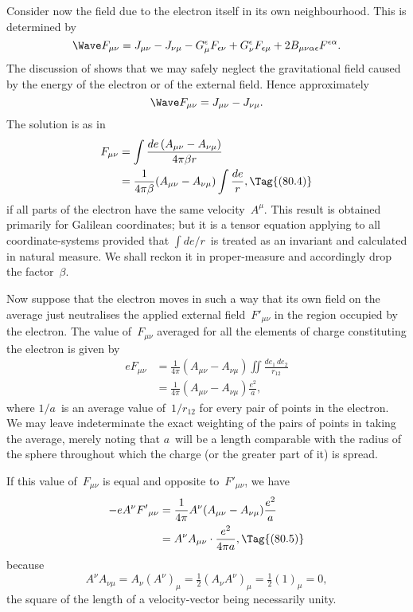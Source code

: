 \documentclass[12pt]{book}
\begin{document}
Consider now the field due to the electron itself in its own neighbourhood.
This is determined by~
\[
\Wave F_{\mu\nu} = J_{\mu\nu} - J_{\nu\mu}
- G_{\mu}^{\epsilon} F_{\epsilon\nu} + G_{\nu}^{\epsilon} F_{\epsilon\mu}
+ 2B_{\mu\nu\alpha\epsilon} F^{\epsilon\alpha}.
\]
The discussion of  shows that we may safely neglect the gravitational
field caused by the energy of the electron or of the external field. Hence
approximately
\[
\Wave F_{\mu\nu} = J_{\mu\nu} - J_{\nu\mu}.
\]
The solution is as in~
\begin{align*}
  F_{\mu\nu} &= \int \frac{de\, (A_{\mu\nu} - A_{\nu\mu})}{4\pi\beta r} \\
  &= \frac{1}{4\pi\beta}(A_{\mu\nu} - A_{\nu\mu}) \int \frac{de}{r},
  \Tag{(80.4)}
\end{align*}
if all parts of the electron have the same velocity~$A^{\mu}$. This result is obtained
primarily for Galilean coordinates; but it is a tensor equation applying to
all coordinate\hyp{}systems provided that $\int de/r$~is treated as an invariant and
calculated in natural measure. We shall reckon it in proper\hyp{}measure and
accordingly drop the factor~$\beta$.

Now suppose that the electron moves in such a way that its own field
on the average just neutralises the applied external field~${F'}_{\mu\nu}$ in the region
occupied by the electron. The value of~$F_{\mu\nu}$ averaged for all the elements of
charge constituting the electron is given by
\begin{align*}
  eF_{\mu\nu}
  &= \frac{1}{4\pi}(A_{\mu\nu} - A_{\nu\mu}) \iint \frac{de_{1}\, de_{2}}{r_{12}} \\
  &= \frac{1}{4\pi}(A_{\mu\nu} - A_{\nu\mu}) \frac{e^{2}}{a},
\end{align*}
where $1/a$~is an average value of~$1/r_{12}$ for every pair of points in the electron.
We may leave indeterminate the exact weighting of the pairs of points in
taking the average, merely noting that $a$~will be a length comparable with
the radius of the sphere throughout which the charge (or the greater part of
it) is spread.

If this value of~$F_{\mu\nu}$ is equal and opposite to~${F'}_{\mu\nu}$, we have
\begin{align*}
  -eA^{\nu} {F'}_{\mu\nu}
  &= \frac{1}{4\pi} A^{\nu} (A_{\mu\nu} - A_{\nu\mu}) \frac{e^{2}}{a} \\
  &= A^{\nu} A_{\mu\nu} \cdot \frac{e^{2}}{4\pi a},
  \Tag{(80.5)}
\end{align*}
because
\[
A^{\nu} A_{\nu\mu} = A_{\nu} (A^{\nu})_{\mu}
= \tfrac{1}{2} (A_{\nu} A^{\nu})_{\mu}
= \tfrac{1}{2} (1)_{\mu}
= 0,
\]
the square of the length of a velocity\hyp{}vector being necessarily unity.
\end{document}
